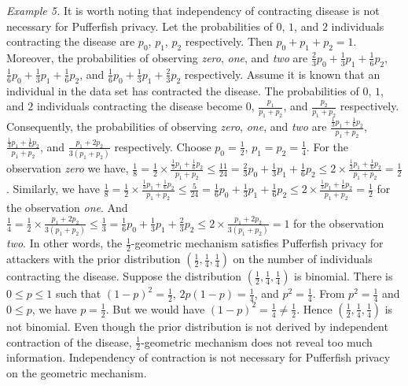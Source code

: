 \noindent
\textit{Example 5.}
It is worth noting that independency of contracting disease is not
necessary for Pufferfish privacy. Let the probabilities of $0$, $1$,
and $2$ individuals contracting the disease are $p_0$, $p_1$, $p_2$
respectively. Then $p_0 + p_1 + p_2 = 1$. Moreover, the probabilities
of observing \textit{zero}, \textit{one}, and \textit{two} are
$\frac{2}{3} p_0 + \frac{1}{3} p_1 + \frac{1}{6} p_2$,
$\frac{1}{6} p_0 + \frac{1}{3} p_1 + \frac{1}{6} p_2$, and
$\frac{1}{6} p_0 + \frac{1}{3} p_1 + \frac{2}{3} p_2$ respectively.
Assume it is known that an individual in the data set has contracted
the disease. The probabilities of $0$, $1$, and $2$ individuals
contracting the disease become $0$, $\frac{p_1}{p_1 + p_2}$, and
$\frac{p_2}{p_1 + p_2}$ respectively. Consequently, the probabilities
of observing \textit{zero}, \textit{one}, and \emph{two} are
$\frac{\frac{1}{3}p_1 + \frac{1}{6}p_2}{p_1 + p_2}$,
$\frac{\frac{1}{3}p_1 + \frac{1}{6}p_2}{p_1 + p_2}$, and
$\frac{p_1 + 2p_2}{3(p_1 + p_2)}$ respectively. Choose $p_0 =
\frac{1}{2}$, $p_1 = p_2 = \frac{1}{4}$. For the observation
\textit{zero} we have, 
$\frac{1}{8} =
\frac{1}{2} \times \frac{\frac{1}{3}p_1 + \frac{1}{6}p_2}{p_1 + p_2}
\leq
\frac{11}{24} =
\frac{2}{3} p_0 + \frac{1}{3} p_1 + \frac{1}{6} p_2
\leq
{2} \times \frac{\frac{1}{3}p_1 + \frac{1}{6}p_2}{p_1 + p_2}
= \frac{1}{2}$.
Similarly, we have
$
\frac{1}{8} =
\frac{1}{2} \times \frac{\frac{1}{3}p_1 + \frac{1}{6}p_2}{p_1 + p_2}
\leq
\frac{5}{24} =
\frac{1}{6} p_0 + \frac{1}{3} p_1 + \frac{1}{6} p_2
\leq
2 \times \frac{\frac{1}{3}p_1 + \frac{1}{6}p_2}{p_1 + p_2}
= \frac{1}{2}$ for the observation \textit{one}. And
$
\frac{1}{4}
=
\frac{1}{2} \times \frac{p_1 + 2p_2}{3(p_1 + p_2)}
\leq
\frac{1}{3}
=
\frac{1}{6} p_0 + \frac{1}{3} p_1 + \frac{2}{3} p_2
\leq 
2 \times \frac{p_1 + 2p_2}{3(p_1 + p_2)}
= 1$ for the observation \textit{two}. In other words, the
$\frac{1}{2}$-geometric mechanism satisfies Pufferfish privacy for
attackers with the prior distribution $(\frac{1}{2}, \frac{1}{4},
\frac{1}{4})$ on the number of individuals contracting the disease.
Suppose the distribution $(\frac{1}{2}, \frac{1}{4},
\frac{1}{4})$ is binomial. There is $0 \leq p \leq 1$ such that
$(1-p)^2 = \frac{1}{2}$, $2p(1-p) = \frac{1}{4}$, and $p^2 =
\frac{1}{4}$. From $p^2 = \frac{1}{4}$ and $0 \leq p$, we have $p =
\frac{1}{2}$. But we would have $(1-p)^2 = \frac{1}{4} \neq
\frac{1}{2}$. Hence $(\frac{1}{2}, \frac{1}{4}, \frac{1}{4})$ is not
binomial. Even though the prior distribution is not derived by
independent contraction of the disease, $\frac{1}{2}$-geometric
mechanism does not reveal too much information. Independency of
contraction is not necessary for Pufferfish privacy on the geometric
mechanism. 

